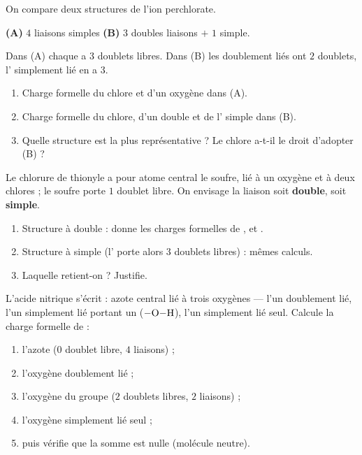 \documentclass[11pt,a4paper]{article}
\begin{document}
\newcommand{\CF}{\ensuremath{\mathrm{C.F.}}}
\begin{exo}
On compare deux structures de l'ion perchlorate.
\begin{center}
\textbf{(A)} $4$ liaisons simples  \qquad
\textbf{(B)} $3$ doubles liaisons $+$ $1$ simple.
\end{center}
Dans (A) chaque  a $3$ doublets libres. Dans (B) les  doublement liés ont $2$
doublets, l' simplement lié en a $3$.
\begin{enumerate}[label=\alph*)]
  \item Charge formelle du chlore et d'un oxygène dans (A).
  \item Charge formelle du chlore, d'un  double et de l' simple dans (B).
  \item Quelle structure est la plus représentative ? Le chlore a-t-il le droit d'adopter (B) ?
\end{enumerate}
\end{exo}

\begin{exo}
Le chlorure de thionyle  a pour atome central le soufre, lié à un oxygène et à deux
chlores ; le soufre porte $1$ doublet libre. On envisage la liaison  soit \textbf{double},
soit \textbf{simple}.
\begin{enumerate}[label=\alph*)]
  \item Structure à  double : donne les charges formelles de ,  et .
  \item Structure à  simple (l' porte alors $3$ doublets libres) : mêmes calculs.
  \item Laquelle retient-on ? Justifie.
\end{enumerate}
\end{exo}

\begin{exo}
L'acide nitrique s'écrit : azote central lié à trois oxygènes — l'un doublement lié, l'un
simplement lié portant un  ($\ce{-O-H}$), l'un simplement lié seul. Calcule la charge
formelle de :
\begin{enumerate}[label=\alph*)]
  \item l'azote ($0$ doublet libre, $4$ liaisons) ;
  \item l'oxygène doublement lié ;
  \item l'oxygène du groupe  ($2$ doublets libres, $2$ liaisons) ;
  \item l'oxygène simplement lié seul ;
  \item puis vérifie que la somme est nulle (molécule neutre).
\end{enumerate}
\end{exo}
\end{document}

